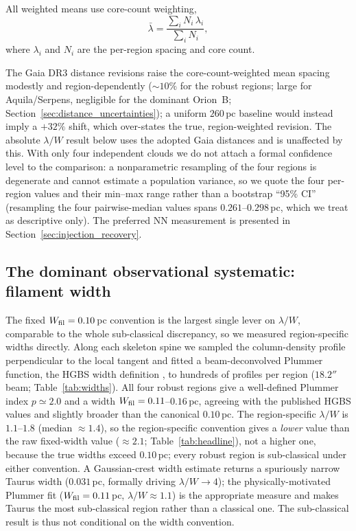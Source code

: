 \documentclass[usenatbib,twoside,twocolumn]{mnras}
\begin{document}
All weighted means use core-count weighting,
\begin{equation}
\bar{\lambda} = \frac{\sum_i N_i\,\lambda_i}{\sum_i N_i},
\label{eq:weighting}
\end{equation}
where $\lambda_i$ and $N_i$ are the per-region spacing and core count.

The Gaia DR3 distance revisions raise the core-count-weighted mean spacing modestly and region-dependently ($\sim10\%$ for the robust regions; large for Aquila/Serpens, negligible for the dominant Orion~B; Section~\ref{sec:distance_uncertainties}); a uniform $260$\,pc baseline would instead imply a $+32\%$ shift, which over-states the true, region-weighted revision. The absolute $\lambda/W$ result below uses the adopted Gaia distances and is unaffected by this. With only four independent clouds we do not attach a formal confidence level to the comparison: a nonparametric resampling of the four regions is degenerate and cannot estimate a population variance, so we quote the four per-region values and their min--max range rather than a bootstrap ``95\% CI'' (resampling the four pairwise-median values spans $0.261$--$0.298$\,pc, which we treat as descriptive only). The preferred NN measurement is presented in Section~\ref{sec:injection_recovery}.

\subsection{The dominant observational systematic: filament width}
\label{sec:widths}

The fixed $W_{\rm fil}=0.10$\,pc convention is the largest single lever on $\lambda/W$, comparable to the whole sub-classical discrepancy, so we measured region-specific widths directly. Along each skeleton spine we sampled the column-density profile perpendicular to the local tangent and fitted a beam-deconvolved Plummer function, the HGBS width definition \citep{Arzoumanian2019}, to hundreds of profiles per region ($18.2''$ beam; Table~\ref{tab:widths}). All four robust regions give a well-defined Plummer index $p\simeq2.0$ and a width $W_{\rm fil}=0.11$--$0.16$\,pc, agreeing with the published HGBS values \citep{Arzoumanian2019} and slightly broader than the canonical $0.10$\,pc. The region-specific $\lambda/W$ is $1.1$--$1.8$ (median $\approx1.4$), so the region-specific convention gives a \emph{lower} value than the raw fixed-width value ($\approx2.1$; Table~\ref{tab:headline}), not a higher one, because the true widths exceed $0.10$\,pc; every robust region is sub-classical under either convention. A Gaussian-crest width estimate returns a spuriously narrow Taurus width ($0.031$\,pc, formally driving $\lambda/W\to4$); the physically-motivated Plummer fit ($W_{\rm fil}=0.11$\,pc, $\lambda/W\approx1.1$) is the appropriate measure and makes Taurus the most sub-classical region rather than a classical one. The sub-classical result is thus not conditional on the width convention.
\end{document}
